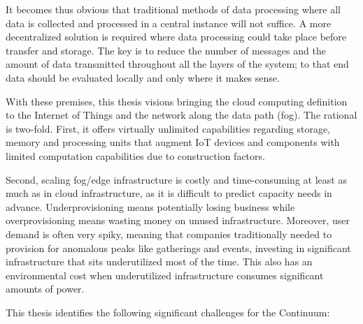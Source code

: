 \documentclass{ieeeaccess}
\begin{document}
It becomes thus obvious that traditional methods of data processing where all data is collected and processed in a central instance will not suffice. A more decentralized solution is required where data processing could take place before transfer and storage. The key is to reduce the number of messages and the amount of data transmitted throughout all the layers of the system; to that end data should be evaluated locally and only where it makes sense.

With these premises, this thesis visions bringing the cloud computing definition to the Internet of Things and the network along the data path (fog). The rational is two-fold. First, it offers virtually unlimited capabilities regarding storage, memory and processing units that augment IoT devices and components with limited computation capabilities due to construction factors.

Second, scaling fog/edge infrastructure is costly and time-consuming at least as much as in cloud infrastructure, as it is difficult to predict capacity needs in advance. Underprovisioning means potentially losing business while overprovisioning means wasting money on unused infrastructure. Moreover, user demand is often very spiky, meaning that companies traditionally needed to provision for anomalous peaks like gatherings and events, investing in significant infrastructure that sits underutilized most of the time. This also has an environmental cost when underutilized infrastructure consumes significant amounts of power.

This thesis identifies the following significant challenges for the Continuum:
\end{document}
